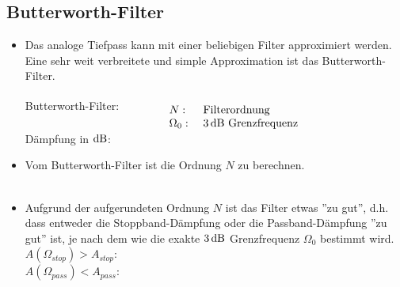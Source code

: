 		\subsection{Butterworth-Filter}
			\begin{itemize}
			 \item Das analoge Tiefpass kann mit einer beliebigen Filter approximiert werden. Eine sehr weit verbreitete und simple Approximation ist das Butterworth-Filter.\\[0cm]
			 Butterworth-Filter:$\qquad$$\qquad\begin{array}{ll}\\[0.2cm]N:&\text{ Filterordnung}\\\Omega_0:&\text{ $3\,\text{dB}$ Grenzfrequenz}\end{array}$\\[0.2cm]
			 Dämpfung in $\text{dB}$:$\qquad\;\;\;$\\[-0.1cm]
			 \item Vom Butterworth-Filter ist die Ordnung $N$ zu berechnen.\\[0.075cm]
			 $\qquad$
			 $\qquad$\\[-0.1cm]
			 \item Aufgrund der aufgerundeten Ordnung $N$ ist das Filter etwas ''zu gut'', d.h. dass entweder die Stoppband-Dämpfung oder die Passband-Dämpfung ''zu gut'' ist, je nach dem wie die exakte $3\,\text{dB}$ Grenzfrequenz $\Omega_0$ bestimmt wird.\\
			 $A(\Omega_{stop})>A_{stop}:\qquad\;$$\qquad$\\[0.2cm]
			 $A(\Omega_{pass})<A_{pass}:\qquad$\\

\end{itemize}
